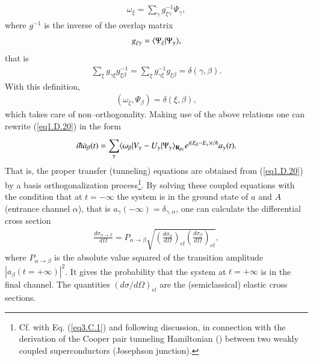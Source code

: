 \begin{subappendices}
\begin{align}
\omega_\xi=\sum_{\gamma}g^{-1}_{\xi\gamma}\Psi_\gamma,
\end{align}
where $g^{-1}$ is the inverse of the overlap matrix
\begin{align}\label{eq1.D.23}
g_{\xi\gamma}=\langle {\Psi_\xi|\Psi_\gamma} \rangle,
\end{align}
that is
\begin{align}\label{eq1.D.24}
\sum_{\xi}g_{\gamma\xi}g^{-1}_{\xi\beta}=\sum_{\xi}^{}g^{-1}_{\gamma\xi}g_{\xi\beta}=\delta(\gamma,\beta).
\end{align}
With this definition,
\begin{align}\label{eq1.D.25}
(\omega_\xi,\Psi_\beta)=\delta(\xi,\beta),
\end{align}
which takes care of non--orthogonality. Making use of the above relations one can rewrite (\ref{eq1.D.20}) in the form
\begin{align}\label{eq1.D.26}
i\hbar \dot a_\beta(t)=\sum_{\gamma}^{}\langle {\omega_\beta|V_\gamma-U_\gamma|\Psi_\gamma} \rangle_{\mathbf R_{\beta\gamma}}e^{i(E_\beta-E_\gamma)t/\hbar}a_\gamma(t).
\end{align}
That is, the proper transfer (tunneling) equations are obtained from (\ref{eq1.D.20}) by a basis orthogonalization process\footnote{Cf. with Eq. (\ref{eq3.C.1}) and following discussion, in connection with the derivation of the Cooper pair tunneling Hamiltonian (\cite{Cohen:62}) between two weakly coupled superconductors (Josephson junction).}. 
 By solving these coupled equations with the condition that at $t=-\infty$ the system is in the ground state of $a$ and $A$ (entrance channel $\alpha$), that is $a_\gamma(-\infty)=\delta_{\gamma,\alpha}$, one can calculate the differential cross section
 \begin{align}\label{eq1.D.27}
 \frac{d\sigma_{\alpha\rightarrow\beta}}{d\Omega}=P_{\alpha\rightarrow\beta}\sqrt{\left(\frac{d\sigma_\alpha}{d\Omega}\right)_{el}\left(\frac{d\sigma_\beta}{d\Omega}\right)_{el}},
 \end{align}
 where $P_{\alpha\rightarrow\beta}$ is the absolute value squared of the transition amplitude $|a_{\beta}(t=+\infty)|^2$. It gives the probability that the system at $t=+\infty$ is in the final channel. The quantities $(d\sigma/d\Omega)_{el}$ are the (semiclassical) elastic cross sections. 
 

\end{subappendices}
